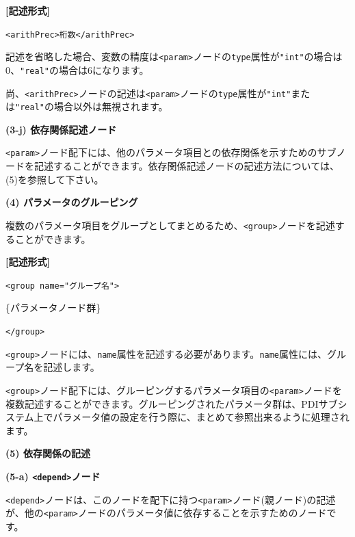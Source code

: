 \documentclass[a4paper,11pt]{jarticle}
\begin{document}
{\vspace{8pt}
\leftskip=12pt
\textbf{[記述形式]}

\leftskip=42pt
\texttt{<arithPrec>桁数</arithPrec>}

\vspace{8pt}
\leftskip=0pt
記述を省略した場合、変数の精度は\texttt{<param>}ノードの{\tt type}属性が\texttt{"int"}の場合は0、\texttt{"real"}の場合は6になります。

尚、\texttt{<arithPrec>}ノードの記述は\texttt{<param>}ノードの{\tt type}属性が\texttt{"int"}または\texttt{"real"}の場合以外は無視されます。

\vspace{12pt}
\textbf{(3-j) 依存関係記述ノード}

\texttt{<param>}ノード配下には、他のパラメータ項目との依存関係を示すためのサブノードを記述することができます。依存関係記述ノードの記述方法については、(5)を参照して下さい。

\vspace{12pt}
\textbf{(4) パラメータのグルーピング}

複数のパラメータ項目をグループとしてまとめるため、\texttt{<group>}ノードを記述することができます。

\vspace{8pt}
\leftskip=12pt
\textbf{[記述形式]}

\leftskip=42pt
\texttt{<group name="グループ名">}    

\parindent=14pt
\{パラメータノード群\}

\parindent=0pt
\texttt{</group>}

\vspace{8pt}
\leftskip=0pt
\texttt{<group>}ノードには、{\tt name}属性を記述する必要があります。{\tt name}属性には、グループ名を記述します。

\vspace{12pt}
\texttt{<group>}ノード配下には、グルーピングするパラメータ項目の\texttt{<param>}ノードを複数記述することができます。グルーピングされたパラメータ群は、PDIサブシステム上でパラメータ値の設定を行う際に、まとめて参照出来るように処理されます。

\vspace{12pt}
\textbf{(5) 依存関係の記述}

\vspace{12pt}
\textbf{(5-a) \texttt{<depend>}ノード}

\texttt{<depend>}ノードは、このノードを配下に持つ\texttt{<param>}ノード(親ノード)の記述が、他の\texttt{<param>}ノードのパラメータ値に依存することを示すためのノードです。

}
\end{document}
